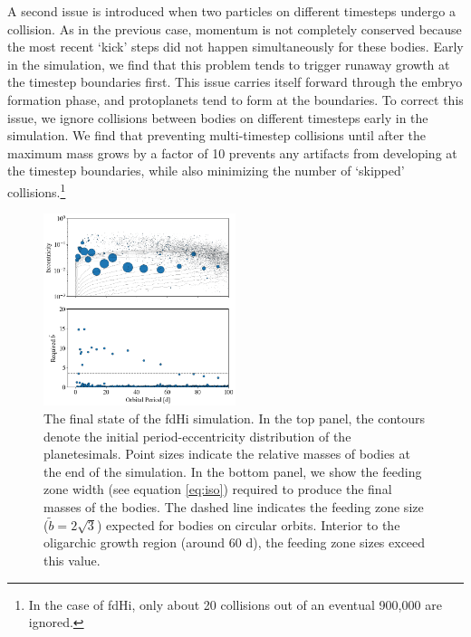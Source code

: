 \documentclass[twocolumn,linenumbers]{aastex63}
\begin{document}
A second issue is introduced when two particles on different timesteps
undergo a collision. As in the previous case, momentum is not
completely conserved because the most recent `kick' steps did not
happen simultaneously for these bodies. Early in the simulation, we
find that this problem tends to trigger runaway growth at the timestep
boundaries first. This issue carries itself forward through the embryo
formation phase, and protoplanets tend to form at the boundaries. To
correct this issue, we ignore collisions between bodies on different
timesteps early in the simulation. We find that preventing
multi-timestep collisions until after the maximum mass grows by a
factor of 10 prevents any artifacts from developing at the timestep
boundaries, while also minimizing the number of `skipped' collisions.\footnote{In the case of fdHi, only about 20 collisions out of an eventual 900,000 are ignored.} 

\begin{figure}
\begin{center}
    \includegraphics[width=0.5\textwidth]{figures/fulldisk_e_m_b.png}
    \caption{The final state of the fdHi simulation. In the top panel,
      the contours denote the initial period-eccentricity distribution
      of the planetesimals. Point sizes indicate the relative masses
      of bodies at the end of the simulation. In the bottom panel, we show the
      feeding zone width (see equation \ref{eq:iso}) required to produce
      the final masses of the bodies. The dashed line indicates the feeding
      zone size ($\tilde{b} = 2 \sqrt{3}$) expected for bodies on
      circular orbits.
      Interior to the oligarchic
      growth region (around 60 d), the feeding zone sizes exceed this value.\label{fig:fulldisk_e_m}}
\end{center}
\end{figure}
\end{document}
